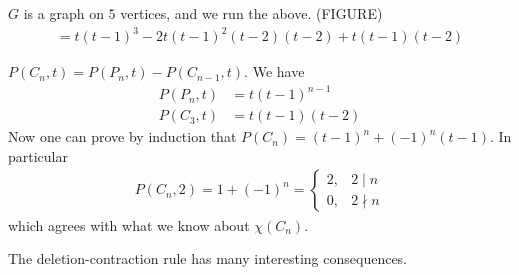 \begin{example} $G$ is a graph on $5$ vertices, and we run the above.
(FIGURE)
\begin{align*}
= t(t-1)^3-2t(t-1)^2(t-2)(t-2)+t(t-1)(t-2)
\end{align*}
\end{example}
\begin{example}
$P(C_n,t)=P(P_n,t)-P(C_{n-1},t)$. We have
\begin{align*}
P(P_n,t)&= t(t-1)^{n-1}\\
P(C_3,t)&=t(t-1)(t-2)
\end{align*}
Now one can prove by induction that $P(C_n)=(t-1)^n+(-1)^n(t-1)$. In particular
\begin{align*}
P(C_n,2)=1+(-1)^n= \left\lbrace \begin{array}{ll}
2, & 2\mid n\\
0, & 2\nmid n
\end{array}\right.
\end{align*}
which agrees with what we know about $\chi(C_n)$.
\end{example}

The deletion-contraction rule has many interesting consequences. 

